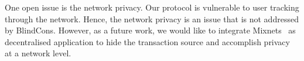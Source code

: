 \documentclass[conference]{llncs}
\newcommand{\name}{BlindCons}
\begin{document}
One open issue is the network privacy. Our protocol is vulnerable to user tracking through the network. Hence, the network privacy is an issue that is not addressed by \name{}. However, as a future work, we would like to integrate Mixnets~\cite{Chaum:1981:UEM:358549.358563} as decentralised application to hide the transaction source and accomplish privacy at a network level.



\end{document}
